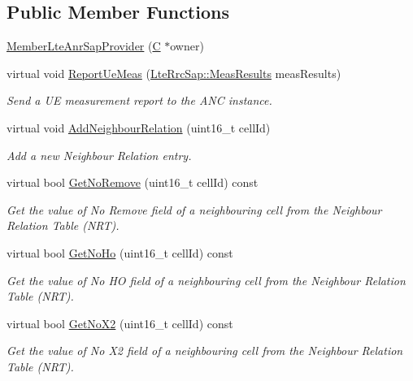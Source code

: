 \subsection*{Public Member Functions}
\begin{DoxyCompactItemize}
\item 
\hyperlink{classns3_1_1MemberLteAnrSapProvider_a5b85b5773dd45eeb60401859529e0472}{Member\+Lte\+Anr\+Sap\+Provider} (\hyperlink{loss__COST231__small__cities__urban_8m_aaa53ca0b650dfd85c4f59fa156f7a2cc}{C} $\ast$owner)
\item 
virtual void \hyperlink{classns3_1_1MemberLteAnrSapProvider_ac062917c3fbc247ab2d6c716972f9f89}{Report\+Ue\+Meas} (\hyperlink{structns3_1_1LteRrcSap_1_1MeasResults}{Lte\+Rrc\+Sap\+::\+Meas\+Results} meas\+Results)
\begin{DoxyCompactList}\small\item\em Send a UE measurement report to the A\+NC instance. \end{DoxyCompactList}\item 
virtual void \hyperlink{classns3_1_1MemberLteAnrSapProvider_aacba67c735be24d7f7cf91025933be72}{Add\+Neighbour\+Relation} (uint16\+\_\+t cell\+Id)
\begin{DoxyCompactList}\small\item\em Add a new Neighbour Relation entry. \end{DoxyCompactList}\item 
virtual bool \hyperlink{classns3_1_1MemberLteAnrSapProvider_ab6fc6bf481276a3ad2c0bc9f20986eb8}{Get\+No\+Remove} (uint16\+\_\+t cell\+Id) const 
\begin{DoxyCompactList}\small\item\em Get the value of {\itshape No Remove} field of a neighbouring cell from the Neighbour Relation Table (N\+RT). \end{DoxyCompactList}\item 
virtual bool \hyperlink{classns3_1_1MemberLteAnrSapProvider_ad726f3619711f92c7ff0796dd484615d}{Get\+No\+Ho} (uint16\+\_\+t cell\+Id) const 
\begin{DoxyCompactList}\small\item\em Get the value of {\itshape No HO} field of a neighbouring cell from the Neighbour Relation Table (N\+RT). \end{DoxyCompactList}\item 
virtual bool \hyperlink{classns3_1_1MemberLteAnrSapProvider_aa02e61eca4e9896c914197e2c501137f}{Get\+No\+X2} (uint16\+\_\+t cell\+Id) const 
\begin{DoxyCompactList}\small\item\em Get the value of {\itshape No X2} field of a neighbouring cell from the Neighbour Relation Table (N\+RT). \end{DoxyCompactList}\end{DoxyCompactItemize}
